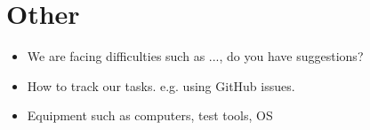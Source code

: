 \documentclass[12pt]{article}
\begin{document}
\section{Other}
\begin{itemize}
\item We are facing difficulties such as ..., do you have suggestions?
\item How to track our tasks. e.g. using GitHub issues.
\item Equipment such as computers, test tools, OS
\end{itemize}
\end{document}
